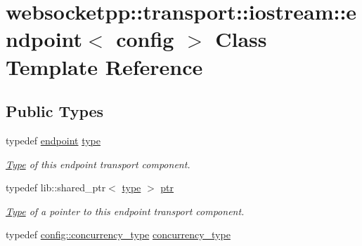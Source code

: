\hypertarget{classwebsocketpp_1_1transport_1_1iostream_1_1endpoint}{}\section{websocketpp\+:\+:transport\+:\+:iostream\+:\+:endpoint$<$ config $>$ Class Template Reference}
\label{classwebsocketpp_1_1transport_1_1iostream_1_1endpoint}
\subsection*{Public Types}
\begin{DoxyCompactItemize}
\item 
\mbox{\label{classwebsocketpp_1_1transport_1_1iostream_1_1endpoint_abc21958efa2ee99de526036fb21f5320}} 
typedef \mbox{\hyperlink{classwebsocketpp_1_1transport_1_1iostream_1_1endpoint}{endpoint}} \mbox{\hyperlink{classwebsocketpp_1_1transport_1_1iostream_1_1endpoint_abc21958efa2ee99de526036fb21f5320}{type}}
\begin{DoxyCompactList}\small\item\em \mbox{\hyperlink{struct_type}{Type}} of this endpoint transport component. \end{DoxyCompactList}\item 
\mbox{\label{classwebsocketpp_1_1transport_1_1iostream_1_1endpoint_a508eb595a20c2b0a15a27d68a7c0bd93}} 
typedef lib\+::shared\+\_\+ptr$<$ \mbox{\hyperlink{classwebsocketpp_1_1transport_1_1iostream_1_1endpoint_abc21958efa2ee99de526036fb21f5320}{type}} $>$ \mbox{\hyperlink{classwebsocketpp_1_1transport_1_1iostream_1_1endpoint_a508eb595a20c2b0a15a27d68a7c0bd93}{ptr}}
\begin{DoxyCompactList}\small\item\em \mbox{\hyperlink{struct_type}{Type}} of a pointer to this endpoint transport component. \end{DoxyCompactList}\item 
\mbox{\label{classwebsocketpp_1_1transport_1_1iostream_1_1endpoint_ad7787af753771da00bf8e6477e52b615}} 
typedef \mbox{\hyperlink{classwebsocketpp_1_1concurrency_1_1none}{config\+::concurrency\+\_\+type}} \mbox{\hyperlink{classwebsocketpp_1_1transport_1_1iostream_1_1endpoint_ad7787af753771da00bf8e6477e52b615}{concurrency\+\_\+type}}

\end{DoxyCompactItemize}
